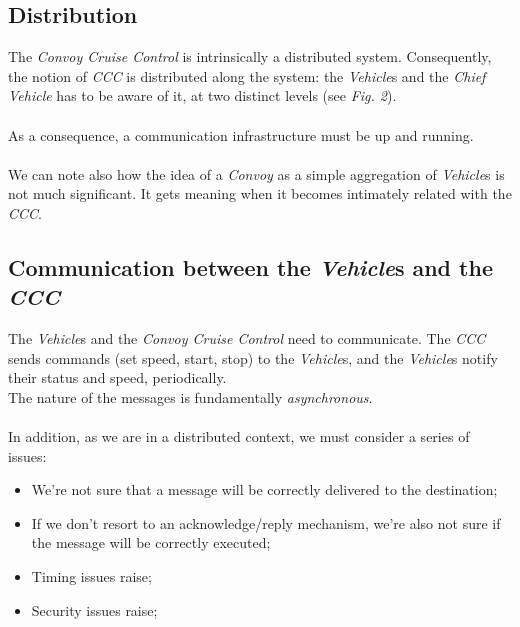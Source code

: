 \documentclass{llncs}
\begin{document}
\subsection{Distribution}
The \emph{Convoy Cruise Control} is intrinsically a distributed system. Consequently, the notion of \emph{CCC} is distributed along the system: the \emph{Vehicle}s and the \emph{Chief Vehicle} has to be aware of it, at two distinct levels (see \emph{Fig. 2}).\\\\
As a consequence, a communication infrastructure must be up and running.\\\\
We can note also how the idea of a \emph{Convoy} as a simple aggregation of \emph{Vehicle}s is not much significant. It gets meaning when it becomes intimately related with the \emph{CCC}.

\subsection{Communication between the \emph{Vehicle}s and the \emph{CCC}}
The \emph{Vehicle}s and the \emph{Convoy Cruise Control} need to communicate. The \emph{CCC} sends commands (set speed, start, stop) to the \emph{Vehicle}s, and the \emph{Vehicle}s notify their status and speed, periodically.\\
The nature of the messages is fundamentally \emph{asynchronous}.\\\\
In addition, as we are in a distributed context, we must consider a series of issues:
\begin{itemize}
  \item We're not sure that a message will be correctly delivered to the destination;
  \item If we don't resort to an acknowledge/reply mechanism, we're also not sure if the message will be correctly executed;
  \item Timing issues raise;
  \item Security issues raise;
\end{itemize}



\end{document}
